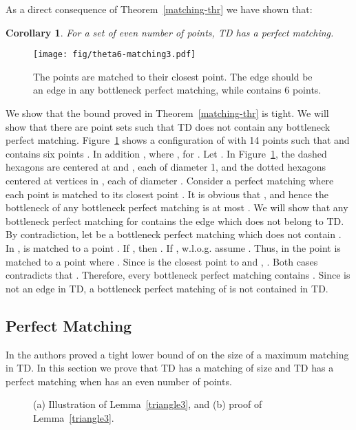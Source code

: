 \documentclass[11pt,a4paper]{article}
\newcommand{\kTD}[2]{\text{-}TD#2}
\newtheorem{corollary}{Corollary}
\begin{document}
As a direct consequence of Theorem~\ref{matching-thr} we have shown that:
\begin{corollary}
 For a set  of even number of points, \kTD{6}{} has a perfect matching.
\end{corollary}

\begin{figure}[htb]
  \centering
  \texttt{[image: fig/theta6-matching3.pdf]}
 \caption{The points  are matched to their closest point. The edge  should be an edge in any bottleneck perfect matching, while  contains 6 points.}
  \label{matching-fig3}
\end{figure}

We show that the bound  proved in Theorem~\ref{matching-thr} is tight. We will show that there are point sets  such that \kTD{5}{} does not contain any bottleneck perfect matching.
Figure~\ref{matching-fig3} shows a configuration of  with 14 points such that  and  contains six points . In addition ,  where , for . Let . In Figure~\ref{matching-fig3}, the dashed hexagons are centered at  and , each of diameter 1, and the dotted hexagons centered at vertices in , each of diameter . Consider a perfect matching  where each point  is matched to its closest point . It is obvious that , and hence the bottleneck of any bottleneck perfect matching is at most . We will show that any bottleneck perfect matching for  contains the edge  which does not belong to \kTD{5}{}. By contradiction, let  be a bottleneck perfect matching which does not contain . In ,  is matched to a point . If , then . If , w.l.o.g. assume . Thus, in  the point  is matched to a point  where . Since  is the closest point to  and , . Both cases contradicts that . Therefore, every bottleneck perfect matching contains . Since  is not an edge in \kTD{5}{}, a bottleneck perfect matching of  is not contained in \kTD{5}{}.  

\subsection{Perfect Matching}
\label{matching2}
In \cite{Babu2013} the authors proved a tight lower bound of  on the size of a maximum matching in \kTD{0}{}. In this section we prove that \kTD{1}{} has a matching of size  and \kTD{2}{} has a perfect matching when  has an even number of points.

\begin{figure}[htb]
  \centering
\setlength{\tabcolsep}{0in}
  
  \caption{(a) Illustration of Lemma~\ref{triangle3}, and (b) proof of Lemma~\ref{triangle3}.}
\label{intersection-fig}
\end{figure}
\end{document}
